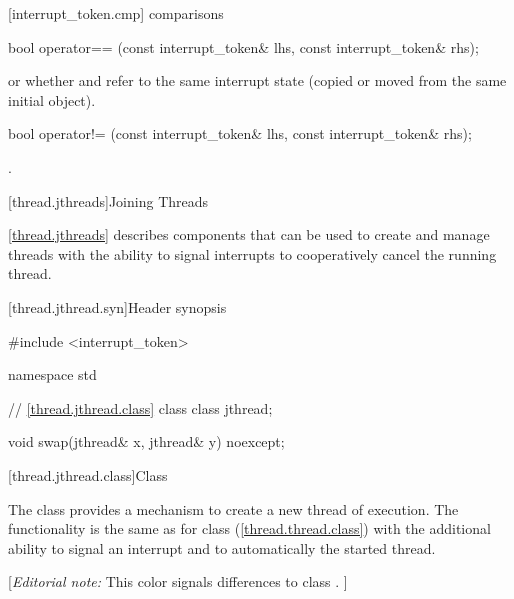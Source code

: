 {%
[interrupt_token.cmp]{ comparisons}

%
\begin{itemdecl}
bool operator== (const interrupt_token& lhs, const interrupt_token& rhs);
\end{itemdecl}
\begin{itemdescr}
  \pnum\returns {} or
                whether  and  refer to the
                same interrupt state
                (copied or moved from the same initial  object).
\end{itemdescr}

%
\begin{itemdecl}
bool operator!= (const interrupt_token& lhs, const interrupt_token& rhs);
\end{itemdecl}
\begin{itemdescr}
  \pnum\returns {}.
\end{itemdescr}


\clearpage

[thread.jthreads]{Joining Threads}


\pnum
\ref{thread.jthreads} describes components that can be used to create and manage threads
with the ability to signal interrupts to cooperatively cancel the running thread.

[thread.jthread.syn]{Header  synopsis}
%

\begin{codeblock}
#include <interrupt_token>

namespace std {
  // \ref{thread.jthread.class} class 
  class jthread;

  void swap(jthread& x, jthread& y) noexcept;
}
\end{codeblock}


[thread.jthread.class]{Class }

\pnum
The class  provides a mechanism
to create a new thread of execution.
The functionality is the same as for class  (\ref{thread.thread.class})
with the additional ability to signal an interrupt and to
automatically  the started thread.

{\color{blue}
[{\itshape{}Editorial note:} {\color{diffcolor}This color signals differences to class .} ]
}

}
